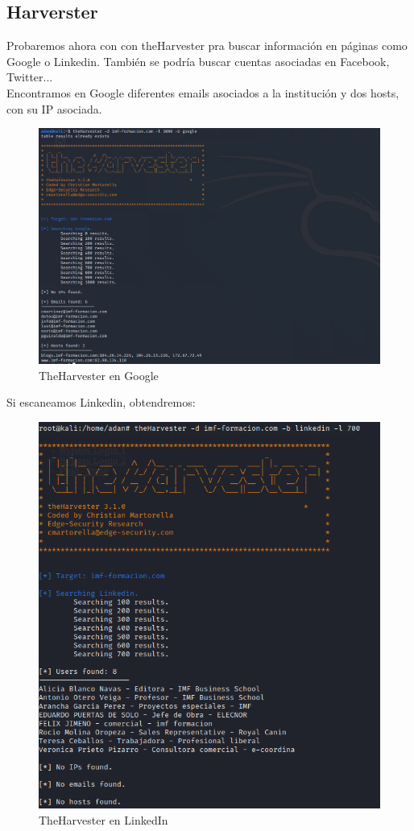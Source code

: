 \documentclass[12pt,twoside]{article}
\begin{document}
\subsection{Harverster}
Probaremos ahora con con theHarvester pra buscar información en páginas como Google o Linkedin. También se podría buscar cuentas asociadas en Facebook, Twitter...\\
Encontramos en Google diferentes emails asociados a la institución y dos hosts, con su  IP asociada.
\begin{figure}[h]
    \centering
    \includegraphics[scale=0.7]{./imagenes/harvester}
    \caption{TheHarvester en Google}
\end{figure}

Si escaneamos Linkedin, obtendremos:

\begin{figure}[h]
    \centering
    \includegraphics[scale=0.6]{./imagenes/harvester_linkedin}
    \caption{TheHarvester en LinkedIn}
\end{figure}
\end{document}
